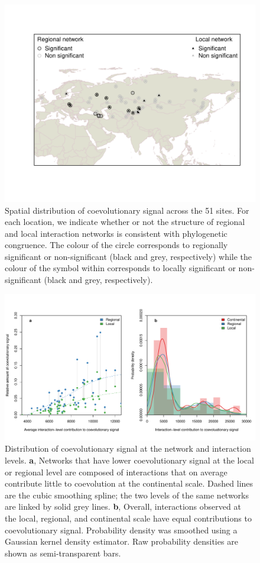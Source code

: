 \documentclass{pnastwo}
\begin{document}
\begin{figure}[p]
\centering
\includegraphics[width=\textwidth]{figure1.pdf}
\caption{Spatial distribution of coevolutionary signal across the 51
sites. For each location, we indicate whether or not the structure of
regional and local interaction networks is consistent with phylogenetic
congruence. The colour of the circle corresponds to regionally
significant or non-significant (black and grey, respectively) while the
colour of the symbol within corresponds to locally significant or
non-significant (black and grey, respectively).}
\end{figure}

\clearpage

\begin{figure}[p]
\centering
\includegraphics[width=\textwidth]{figure4.pdf}
\caption{Distribution of coevolutionary signal at the network and
interaction levels. \textbf{a}, Networks that have lower coevolutionary
signal at the local or regional level are composed of interactions that
on average contribute little to coevolution at the continental scale.
Dashed lines are the cubic smoothing spline; the two levels of the same
networks are linked by solid grey lines. \textbf{b}, Overall,
interactions observed at the local, regional, and continental scale have
equal contributions to coevolutionary signal. Probability density was
smoothed using a Gaussian kernel density estimator. Raw probability
densities are shown as semi-transparent bars.}
\end{figure}
\end{document}
